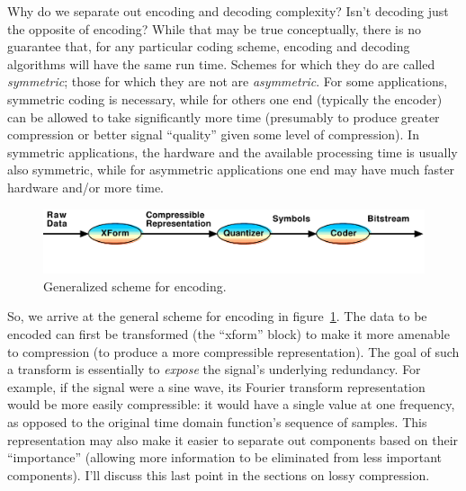 Why do we separate out encoding and decoding complexity? Isn't decoding
just the opposite of encoding? While that may be true conceptually,
there is no guarantee that, for any particular coding scheme, encoding
and decoding algorithms will have the same run time. Schemes for which
they do are called \emph{symmetric}; those for which they are not are
\emph{asymmetric}.  For some applications, symmetric coding is
necessary, while for others one end (typically the encoder) can be
allowed to take significantly more time (presumably to produce greater
compression or better signal ``quality'' given some level of
compression). In symmetric applications, the hardware and the
available processing time is usually also symmetric, while for
asymmetric applications one end may have much faster hardware and/or
more time.

\begin{figure}
\centerline{\includegraphics[width=\textwidth]{ch-comp/encoding}}
\caption{Generalized scheme for encoding.\label{fg:encoding}}
\end{figure}

So, we arrive at the general scheme for encoding in
figure~\ref{fg:encoding}.  The data to be encoded can first be
transformed (the ``xform'' block) to make it more amenable to
compression (to produce a more compressible representation). The goal
of such a transform is essentially to \emph{expose} the signal's
underlying redundancy. For example, if the signal were a sine wave,
its Fourier transform representation would be more easily
compressible: it would have a single value at one frequency, as
opposed to the original time domain function's sequence of
samples. This representation may also make it easier to separate out
components based on their ``importance'' (allowing more information to
be eliminated from less important components).  I'll discuss this last
point in the sections on lossy compression.

